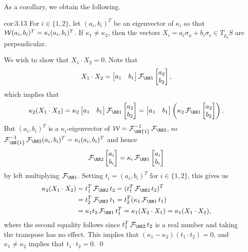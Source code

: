 As a corollary, we obtain the following. 

\begin{cor}{cor:3.13}
    For $i \in \{1, 2\}$, let $(a_i, b_i)^T$ be an eigenvector of 
    $\kappa_i$ so that ${\cal W}(a_i, b_i)^T = \kappa_i (a_i, b_i)^T$. If $\kappa_1 \neq \kappa_2$, 
    then the vectors $X_i = a_i \sigma_u + b_i \sigma_v \in T_{p_0}S$ 
    are perpendicular. 
\end{cor}\vspace{-0.25cm}
\begin{pf}
    We wish to show that $X_1 \cdot X_2 = 0$. Note that 
    \[ X_1 \cdot X_2 = \begin{bmatrix}
        a_1 & b_1 
    \end{bmatrix} \FFF \begin{bmatrix}
        a_2 \\ b_2 
    \end{bmatrix}, \] 
    which implies that 
    \[ \kappa_2(X_1 \cdot X_2) = \kappa_2 \begin{bmatrix}
        a_1 & b_1 
    \end{bmatrix} \FFF \begin{bmatrix}
        a_2 \\ b_2 
    \end{bmatrix} = \begin{bmatrix}
        a_1 & b_1 
    \end{bmatrix} \left( \kappa_2 \FFF \begin{bmatrix}
        a_2 \\ b_2 
    \end{bmatrix} \right). \] 
    But $(a_i, b_i)^T$ is a $\kappa_i$-eigenvector of ${\cal W} = 
    {\cal F}_{\text{\RN{1}}}^{-1} \SFF$, so 
    ${\cal F}_{\text{\RN{1}}}^{-1} \SFF (a_i, b_i)^T 
    = \kappa_i (a_i, b_i)^T$ and hence 
    \[ \SFF \begin{bmatrix}
        a_i \\ b_i 
    \end{bmatrix} = \kappa_i \FFF \begin{bmatrix}
        a_i \\ b_i 
    \end{bmatrix} \] 
    by left multiplying $\FFF$. Setting $t_i = (a_i, b_i)^T$ 
    for $i \in \{1, 2\}$, this gives us
    \begin{align*}
        \kappa_2(X_1 \cdot X_2) 
        &= t_1^T \SFF t_2  
        = (t_1^T \SFF t_2)^T \\
        &= t_2^T \SFF t_1 
        = t_2^T (\kappa_1 \FFF t_1) \\ 
        &= \kappa_1 t_2 \FFF t_1^T 
        = \kappa_1 (X_2 \cdot X_1) 
        = \kappa_1 (X_1 \cdot X_2),
    \end{align*}
    where the second equality follows since $t_1^T \SFF t_2$ is 
    a real number and taking the transpose has no effect. 
    This implies that $(\kappa_1 - \kappa_2)(t_1 \cdot t_2) = 0$, and 
    $\kappa_1 \neq \kappa_2$ implies that $t_1 \cdot t_2 = 0$. \qed 
\end{pf}\vspace{-0.25cm}

